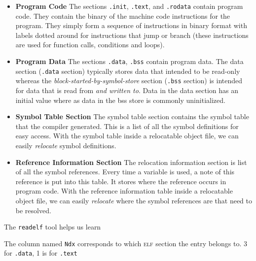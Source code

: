 \begin{itemize}   
\renewcommand{\labelitemi}{$\Box$}
\item \textbf{Program Code} The sections \lstinline{.init}, \lstinline{.text},
and \lstinline{.rodata} contain program code. They contain the binary of the 
machine code instructions for the program. They simply form a sequence 
of instructions in binary format with labels dotted around for instructions 
that jump or branch (these instructions are used for function calls, conditions and loops). 
\item \textbf{Program Data} 
The sections \lstinline{.data}, \lstinline{.bss} contain program data. 
The data section (\lstinline{.data} section) typically stores data that intended to be read-only 
whereas the \textit{block-started-by-symbol-store} section (\lstinline{.bss} section) 
is intended for data that is read from \textit{and written to}. 
Data in the data section has an initial value where as 
data in the bss store is commonly uninitialized.

\item \textbf{Symbol Table Section} 
The symbol table section contains the symbol table that the 
compiler generated. This is a list of all the symbol definitions for easy access. 
With the symbol table inside a relocatable object file, 
we can easily \textit{relocate} symbol definitions.
\item \textbf{Reference Information Section} 
The relocation information section is list of all the symbol references. 
Every time a variable is used, a note of this reference is put into this table. 
It stores where the reference occurs in program code. With the 
reference information table inside a relocatable object file, 
we can easily \textit{relocate} where the symbol references are that need to be resolved.
\end{itemize}

\frmrule

The \lstinline{readelf} tool helps us learn 

The column named \lstinline{Ndx} corresponds to which \textsc{elf} section
the entry belongs to. 3 for \lstinline{.data}, 1 is for \lstinline{.text}


\frmrule

\begin{figure}[h]
\end{figure}


